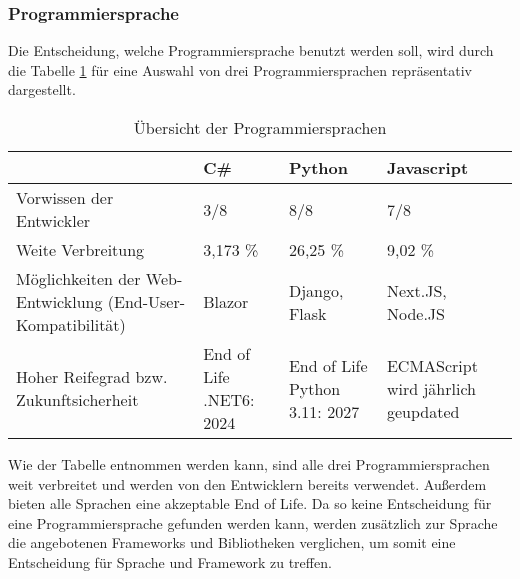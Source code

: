 \subsubsection*{Programmiersprache}

Die Entscheidung, welche Programmiersprache benutzt werden soll, wird durch die Tabelle \ref{tab:programming_languages} für eine Auswahl von drei Programmiersprachen repräsentativ dargestellt.

\begin{table}[H]
  \begin{tabular} {|m{3cm}|m{3cm}|m{3cm}|m{3cm}|}
    \hline
    & C\# & Python & Javascript \\
    \hline
    Vorwissen der Entwickler & 3/8 & 8/8 & 7/8 \\
    \hline
    Weite Verbreitung & 3,173 \%\cite{noauthor_github_nodate} & 26,25 \%\cite{noauthor_github_nodate} & 9,02 \%\cite{noauthor_github_nodate} \\
    \hline
    Möglichkeiten der Web-Entwicklung (End-User-Kompatibilität) & Blazor & Django, Flask & Next.JS, Node.JS \\
    \hline
    Hoher Reifegrad bzw. Zukunftsicherheit & End of Life .NET6: 2024\cite{noauthor_.net_nodate} & End of Life Python 3.11: 2027\cite{noauthor_python_nodate} & ECMAScript wird jährlich geupdated\cite{noauthor_javascript_nodate} \\
    \hline
  \end{tabular}
  \caption{Übersicht der Programmiersprachen}
  \label{tab:programming_languages}
\end{table}\noindent
Wie der Tabelle entnommen werden kann, sind alle drei Programmiersprachen weit verbreitet und werden von den Entwicklern bereits verwendet.
Außerdem bieten alle Sprachen eine akzeptable End of Life.
Da so keine Entscheidung für eine Programmiersprache gefunden werden kann, werden zusätzlich zur Sprache die angebotenen Frameworks und Bibliotheken verglichen, um somit eine Entscheidung für Sprache und Framework zu treffen.




